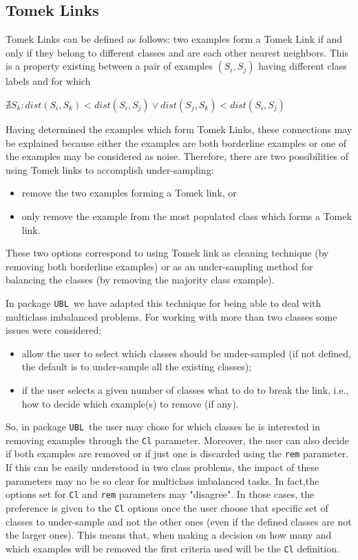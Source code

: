 \documentclass[10pt,a4paper]{article}\usepackage[]{graphicx}\usepackage[]{color}
\newcommand{\UBL}{package \texttt{UBL}\ }
\begin{document}
\subsection{Tomek Links}\label{sec:Tomek}

Tomek Links \cite{tomek1976two} can be defined as follows: two examples form a Tomek Link if and only if they belong to different classes and are each other nearest neighbors. This is a property existing between a pair of examples $(S_i, S_j)$ having different class labels and for which 

$\nexists S_k : dist(S_i,S_k) < dist(S_i,S_j) \vee dist(S_j, S_k)<dist(S_i,S_j)$

\noindent Having determined the examples which form Tomek Links, these connections may be explained because either the examples are both borderline examples or one of the examples may be considered as noise.
Therefore, there are two possibilities of using Tomek links to accomplish under-sampling:
\begin{itemize}
  \item remove the two examples forming a Tomek link, or
  \item only remove the example from the most populated class which forms a Tomek link.
\end{itemize}

These two options correspond to using Tomek link as cleaning technique (by removing both borderline examples) or as an under-sampling method for balancing the classes (by removing the majority class example).


In \UBL we have adapted this technique for being able to deal with multiclass imbalanced problems. 
For working with more than two classes some issues were considered: 
\begin{itemize}
\item allow the user to select which classes should be under-sampled (if not defined, the default is to under-sample all the existing classes);
\item if the user selects a given number of classes what to do to break the link, i.e., how to decide which example(s) to remove (if any). 
\end{itemize}
So, in \UBL the user may chose for which classes he is interested in removing examples through the \texttt{Cl} parameter. Moreover, the user can also decide if both examples are removed or if just one is discarded using the \texttt{rem} parameter. If this can be easily understood in two class problems, the impact of these parameters may no be so clear for multiclass imbalanced tasks. 
In fact,the options set for \texttt{Cl} and \texttt{rem} parameters may "disagree". In those cases, the preference is given to the \texttt{Cl} options once the user choose that specific set of classes to under-sample and not the other ones (even if the defined classes are not the larger ones). This means that, when making a decision on how many and which examples will be removed the first criteria used will be the \texttt{Cl} definition.
\end{document}
